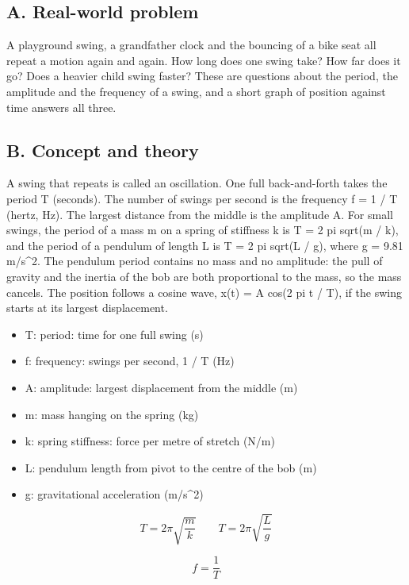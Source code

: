 \documentclass[11pt,a4paper]{article}
\begin{document}
\subsection*{A. Real-world problem}
A playground swing, a grandfather clock and the bouncing of a bike seat all repeat a motion again and again. How long does one swing take? How far does it go? Does a heavier child swing faster? These are questions about the period, the amplitude and the frequency of a swing, and a short graph of position against time answers all three.

\subsection*{B. Concept and theory}
A swing that repeats is called an oscillation. One full back-and-forth takes the period T (seconds). The number of swings per second is the frequency f = 1 / T (hertz, Hz). The largest distance from the middle is the amplitude A. For small swings, the period of a mass m on a spring of stiffness k is T = 2 pi sqrt(m / k), and the period of a pendulum of length L is T = 2 pi sqrt(L / g), where g = 9.81 m/s\textasciicircum{}2. The pendulum period contains no mass and no amplitude: the pull of gravity and the inertia of the bob are both proportional to the mass, so the mass cancels. The position follows a cosine wave, x(t) = A cos(2 pi t / T), if the swing starts at its largest displacement.

\begin{itemize}[nosep]
\item T: period: time for one full swing (s)
\item f: frequency: swings per second, 1 / T (Hz)
\item A: amplitude: largest displacement from the middle (m)
\item m: mass hanging on the spring (kg)
\item k: spring stiffness: force per metre of stretch (N/m)
\item L: pendulum length from pivot to the centre of the bob (m)
\item g: gravitational acceleration (m/s\textasciicircum{}2)
\end{itemize}

\begin{equation*}
T = 2\pi\sqrt{\frac{m}{k}}\qquad T = 2\pi\sqrt{\frac{L}{g}}
\end{equation*}

\begin{equation*}
f = \frac{1}{T}
\end{equation*}
\end{document}
